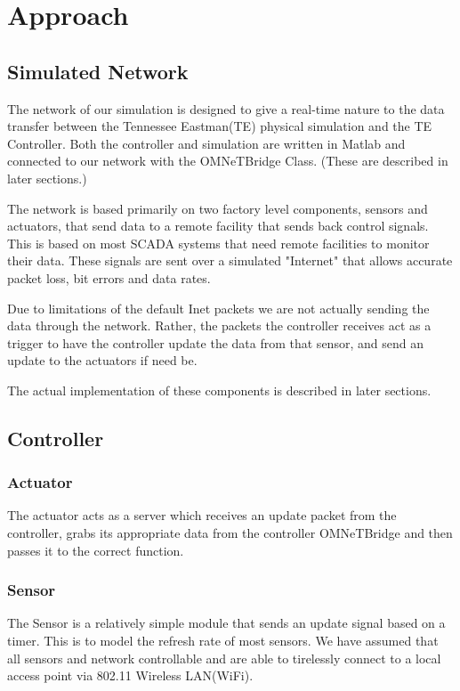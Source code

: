 \section{Approach}
\subsection{Simulated Network}

The network of our simulation is designed to give a real-time nature to the data transfer between the Tennessee Eastman(TE) physical simulation and the TE Controller. Both the controller and simulation are written in Matlab and connected to our network with the OMNeTBridge Class. (These are described in later sections.)

The network is based primarily on two factory level components, sensors and actuators, that send data to a remote facility that sends back control signals. This is based on most SCADA systems that need remote facilities to monitor their data. These signals are sent over a simulated "Internet" that allows accurate packet loss, bit errors and data rates. 

Due to limitations of the default Inet packets we are not actually sending the data through the network. Rather, the packets the controller receives act as a trigger to have the controller update the data from that sensor, and send an update to the actuators if need be. 

The actual implementation of these components is described in later sections. 


\subsection{Controller}


\subsubsection{Actuator}

The actuator acts as a server which receives an update packet from the controller, grabs its appropriate data from the controller OMNeTBridge and then passes it to the correct function.

\subsubsection{Sensor}


The Sensor is a relatively simple module that sends an update signal based on a timer. This is to model the refresh rate of most sensors. We have assumed that all sensors and network controllable and are able to tirelessly connect to a local access point via 802.11 Wireless LAN(WiFi). 

